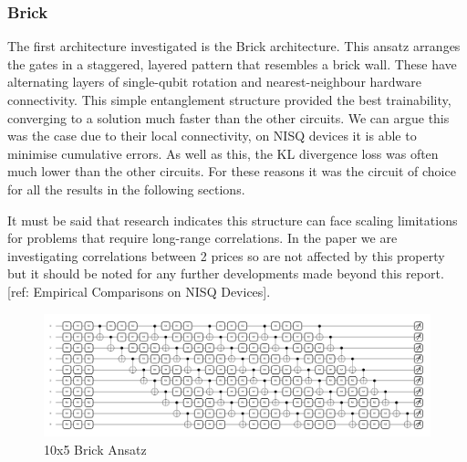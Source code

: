 \documentclass[12pt]{article}
\newcommand{\newp}
    {
    \vskip 0.5cm 
  }
\numberwithin{equation}{section}
\begin{document}
\subsubsection{Brick}
The first architecture investigated is the Brick architecture. This ansatz arranges
the gates in a staggered, layered pattern that resembles a brick wall. These 
have alternating layers of single-qubit rotation and nearest-neighbour hardware
connectivity. This simple
entanglement structure provided the best trainability, converging to a solution 
much faster than the other circuits. We can argue this was the case due to 
their local connectivity, on NISQ devices it is able to minimise cumulative 
errors. 
As well as this, the KL divergence loss was 
often much lower than the other circuits. For these reasons it was the circuit 
of choice for all the results in the following sections.
\newp 
It must be said that research indicates this structure can face scaling limitations 
for problems that require long-range correlations. In the paper we are investigating 
correlations between 2 prices so are not affected by this property but it should 
be noted for any further developments made beyond this report. [ref:  Empirical Comparisons on NISQ Devices]. 

\begin{figure}[h!]
  \centering 
  \includegraphics[width=\linewidth]{ten5brick.png}
  \caption{10x5 Brick Ansatz}
  \label{fig:brick}
\end{figure}
\end{document}
